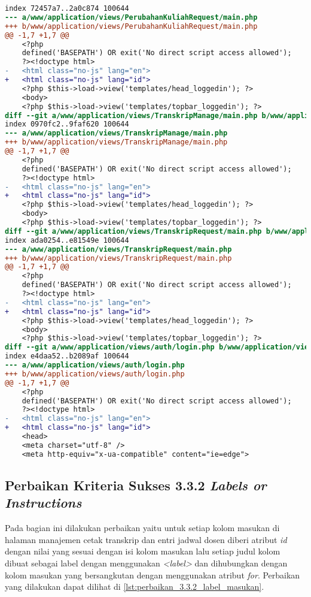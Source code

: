 \begin{lstlisting}[frame=single, label={lst:perbaikan_3.1.1_bahasa_halaman}, language=diff, caption=Perbaikan Kriteria Sukses 3.1.1 - Bahasa yang Tidak Sesuai]
index 72457a7..2a0c874 100644
--- a/www/application/views/PerubahanKuliahRequest/main.php
+++ b/www/application/views/PerubahanKuliahRequest/main.php
@@ -1,7 +1,7 @@
    <?php
    defined('BASEPATH') OR exit('No direct script access allowed');
    ?><!doctype html>
-   <html class="no-js" lang="en">
+   <html class="no-js" lang="id">
    <?php $this->load->view('templates/head_loggedin'); ?>
    <body>
    <?php $this->load->view('templates/topbar_loggedin'); ?>
diff --git a/www/application/views/TranskripManage/main.php b/www/application/views/TranskripManage/main.php
index 0970fc2..9faf620 100644
--- a/www/application/views/TranskripManage/main.php
+++ b/www/application/views/TranskripManage/main.php
@@ -1,7 +1,7 @@
    <?php
    defined('BASEPATH') OR exit('No direct script access allowed');
    ?><!doctype html>
-   <html class="no-js" lang="en">
+   <html class="no-js" lang="id">
    <?php $this->load->view('templates/head_loggedin'); ?>
    <body>
    <?php $this->load->view('templates/topbar_loggedin'); ?>
diff --git a/www/application/views/TranskripRequest/main.php b/www/application/views/TranskripRequest/main.php
index ada0254..e81549e 100644
--- a/www/application/views/TranskripRequest/main.php
+++ b/www/application/views/TranskripRequest/main.php
@@ -1,7 +1,7 @@
    <?php
    defined('BASEPATH') OR exit('No direct script access allowed');
    ?><!doctype html>
-   <html class="no-js" lang="en">
+   <html class="no-js" lang="id">
    <?php $this->load->view('templates/head_loggedin'); ?>
    <body>
    <?php $this->load->view('templates/topbar_loggedin'); ?>
diff --git a/www/application/views/auth/login.php b/www/application/views/auth/login.php
index e4daa52..b2089af 100644
--- a/www/application/views/auth/login.php
+++ b/www/application/views/auth/login.php
@@ -1,7 +1,7 @@
    <?php
    defined('BASEPATH') OR exit('No direct script access allowed');
    ?><!doctype html>
-   <html class="no-js" lang="en">
+   <html class="no-js" lang="id">
    <head>
    <meta charset="utf-8" />
    <meta http-equiv="x-ua-compatible" content="ie=edge">
\end{lstlisting}

\subsection{Perbaikan Kriteria Sukses 3.3.2 \textit{Labels or Instructions}}
\label{subsec:perbaikan_kriteria_sukses_3.3.2}
Pada bagian ini dilakukan perbaikan yaitu untuk setiap kolom masukan di halaman manajemen cetak transkrip dan entri jadwal dosen diberi atribut \textit{id} dengan nilai yang sesuai dengan isi kolom masukan lalu setiap judul kolom dibuat sebagai label dengan menggunakan \textit{<label>} dan dihubungkan dengan kolom masukan yang bersangkutan dengan menggunakan atribut \textit{for}. Perbaikan yang dilakukan dapat dilihat di \ref{lst:perbaikan_3.3.2_label_masukan}.


